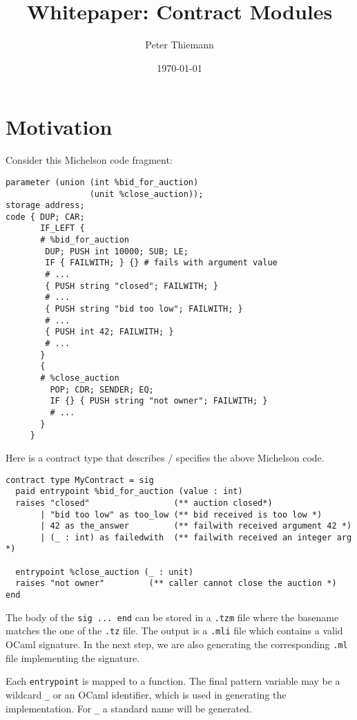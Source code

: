 \documentclass[a4paper]{llncs}
\title{Whitepaper: Contract Modules}
\author{Peter Thiemann}
\institute{}
\date{\today}
\begin{document}
\maketitle
\pagestyle{plain}

\section{Motivation}
\label{sec:motivation}


Consider this Michelson code fragment:
\begin{lstlisting}[language=michelson,caption={Michelson code example},label={lst:code-example}]
parameter (union (int %bid_for_auction)
                 (unit %close_auction));
storage address;
code { DUP; CAR; 
       IF_LEFT {
       # %bid_for_auction
        DUP; PUSH int 10000; SUB; LE;
        IF { FAILWITH; } {} # fails with argument value
        # ...
        { PUSH string "closed"; FAILWITH; }
        # ...
        { PUSH string "bid too low"; FAILWITH; }
        # ...
        { PUSH int 42; FAILWITH; }
        # ...
       }
       {
       # %close_auction
         POP; CDR; SENDER; EQ;
         IF {} { PUSH string "not owner"; FAILWITH; }
         # ...
       }
     }
\end{lstlisting}

Here is a contract type that describes / specifies the above Michelson code.
\begin{lstlisting}[caption={Contract module example},label={lst:contract-module-example}]
contract type MyContract = sig
  paid entrypoint %bid_for_auction (value : int) 
  raises "closed"                 (** auction closed*)
       | "bid too low" as too_low (** bid received is too low *)
       | 42 as the_answer         (** failwith received argument 42 *)
       | (_ : int) as failedwith  (** failwith received an integer arg *)

  entrypoint %close_auction (_ : unit)
  raises "not owner"         (** caller cannot close the auction *)
end
\end{lstlisting}

The body of the \lstinline/sig ... end/ can be stored in a
\texttt{.tzm} file where the basename matches the one of the
\texttt{.tz} file. The output is a \texttt{.mli} file which contains a
valid OCaml signature. In the next step, we are also generating the
corresponding \texttt{.ml} file implementing the signature.

Each \lstinline/entrypoint/ is mapped to a function. The final pattern
variable may be a wildcard \lstinline/_/ or an OCaml identifier, which
is used in generating the implementation. For \lstinline/_/ a standard
name will be generated.
\end{document}
